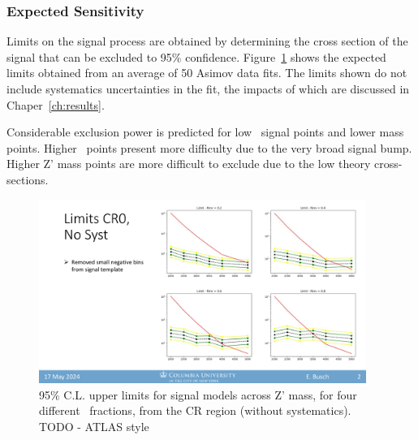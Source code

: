\clearpage
\subsubsection{Expected Sensitivity}
\label{subsec:fit_expsens}

Limits on the signal process are obtained by determining the cross section of the signal that can be excluded to 95\% confidence. 
Figure~\ref{fig:limits_exp_1D} shows the expected limits obtained from an average of 50 Asimov data fits. The limits shown do not include systematics uncertainties in the fit, the impacts of which are discussed in Chaper~\ref{ch:results}. 

Considerable exclusion power is predicted for low \rinv~signal points and lower mass points.
Higher \rinv~points present more difficulty due to the very broad signal bump.
Higher Z' mass points are more difficult to exclude due to the low theory cross-sections.

\begin{figure}[!htbp]
\centering
   \includegraphics[width=0.95\textwidth]{figures/stats/limits_exp_1D}
    \caption{95\% C.L. upper limits for signal models across Z' mass, for four different \rinv~fractions, from the CR region (without systematics). TODO - ATLAS style
    \label{fig:limits_exp_1D}}
\end{figure}

